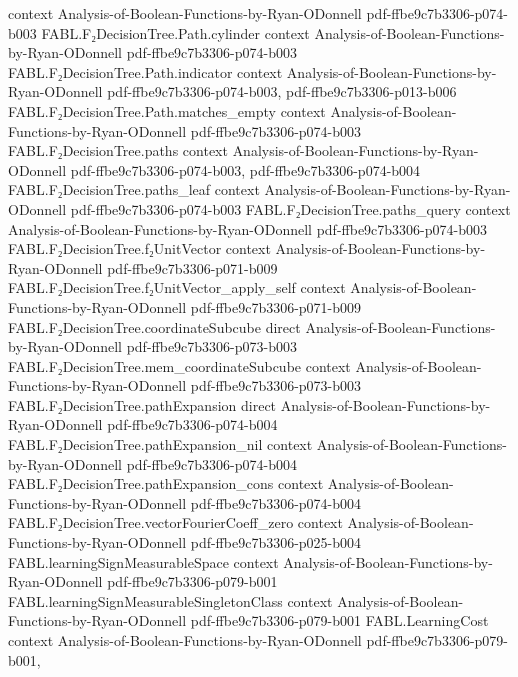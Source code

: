 \begin{theorem}
  {context}
  {Analysis-of-Boolean-Functions-by-Ryan-ODonnell}
  {pdf-ffbe9c7b3306-p074-b003}
\proofstep
  {FABL.F₂DecisionTree.Path.cylinder}
  {context}
  {Analysis-of-Boolean-Functions-by-Ryan-ODonnell}
  {pdf-ffbe9c7b3306-p074-b003}
\proofstep
  {FABL.F₂DecisionTree.Path.indicator}
  {context}
  {Analysis-of-Boolean-Functions-by-Ryan-ODonnell}
  {pdf-ffbe9c7b3306-p074-b003,
    pdf-ffbe9c7b3306-p013-b006}
\proofstep
  {FABL.F₂DecisionTree.Path.matches_empty}
  {context}
  {Analysis-of-Boolean-Functions-by-Ryan-ODonnell}
  {pdf-ffbe9c7b3306-p074-b003}
\proofstep
  {FABL.F₂DecisionTree.paths}
  {context}
  {Analysis-of-Boolean-Functions-by-Ryan-ODonnell}
  {pdf-ffbe9c7b3306-p074-b003,
    pdf-ffbe9c7b3306-p074-b004}
\proofstep
  {FABL.F₂DecisionTree.paths_leaf}
  {context}
  {Analysis-of-Boolean-Functions-by-Ryan-ODonnell}
  {pdf-ffbe9c7b3306-p074-b003}
\proofstep
  {FABL.F₂DecisionTree.paths_query}
  {context}
  {Analysis-of-Boolean-Functions-by-Ryan-ODonnell}
  {pdf-ffbe9c7b3306-p074-b003}
\proofstep
  {FABL.F₂DecisionTree.f₂UnitVector}
  {context}
  {Analysis-of-Boolean-Functions-by-Ryan-ODonnell}
  {pdf-ffbe9c7b3306-p071-b009}
\proofstep
  {FABL.F₂DecisionTree.f₂UnitVector_apply_self}
  {context}
  {Analysis-of-Boolean-Functions-by-Ryan-ODonnell}
  {pdf-ffbe9c7b3306-p071-b009}
\proofstep
  {FABL.F₂DecisionTree.coordinateSubcube}
  {direct}
  {Analysis-of-Boolean-Functions-by-Ryan-ODonnell}
  {pdf-ffbe9c7b3306-p073-b003}
\proofstep
  {FABL.F₂DecisionTree.mem_coordinateSubcube}
  {context}
  {Analysis-of-Boolean-Functions-by-Ryan-ODonnell}
  {pdf-ffbe9c7b3306-p073-b003}
\proofstep
  {FABL.F₂DecisionTree.pathExpansion}
  {direct}
  {Analysis-of-Boolean-Functions-by-Ryan-ODonnell}
  {pdf-ffbe9c7b3306-p074-b004}
\proofstep
  {FABL.F₂DecisionTree.pathExpansion_nil}
  {context}
  {Analysis-of-Boolean-Functions-by-Ryan-ODonnell}
  {pdf-ffbe9c7b3306-p074-b004}
\proofstep
  {FABL.F₂DecisionTree.pathExpansion_cons}
  {context}
  {Analysis-of-Boolean-Functions-by-Ryan-ODonnell}
  {pdf-ffbe9c7b3306-p074-b004}
\proofstep
  {FABL.F₂DecisionTree.vectorFourierCoeff_zero}
  {context}
  {Analysis-of-Boolean-Functions-by-Ryan-ODonnell}
  {pdf-ffbe9c7b3306-p025-b004}
\proofstep
  {FABL.learningSignMeasurableSpace}
  {context}
  {Analysis-of-Boolean-Functions-by-Ryan-ODonnell}
  {pdf-ffbe9c7b3306-p079-b001}
\proofstep
  {FABL.learningSignMeasurableSingletonClass}
  {context}
  {Analysis-of-Boolean-Functions-by-Ryan-ODonnell}
  {pdf-ffbe9c7b3306-p079-b001}
\proofstep
  {FABL.LearningCost}
  {context}
  {Analysis-of-Boolean-Functions-by-Ryan-ODonnell}
  {pdf-ffbe9c7b3306-p079-b001,
}
\end{theorem}
